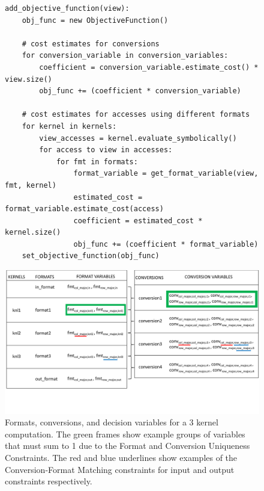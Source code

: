 \documentclass[sigconf,review=true]{acmart}
\begin{document}
\begin{figure}
\begin{lstlisting}[caption={Algorithm for constructing objective function.}, label={AlgObjFunc}]
add_objective_function(view):
	obj_func = new ObjectiveFunction()
	
	# cost estimates for conversions
	for conversion_variable in conversion_variables:
		coefficient = conversion_variable.estimate_cost() * view.size()
		obj_func += (coefficient * conversion_variable)
	
	# cost estimates for accesses using different formats
	for kernel in kernels:
		view_accesses = kernel.evaluate_symbolically()
		for access to view in accesses:
			for fmt in formats:
				format_variable = get_format_variable(view, fmt, kernel)
				estimated_cost = format_variable.estimate_cost(access)
				coefficient = estimated_cost * kernel.size()
				obj_func += (coefficient * format_variable)
	set_objective_function(obj_func)
\end{lstlisting}
\end{figure}

\begin{figure}
	\includegraphics[width=2\columnwidth]{FormatConversionFigure.pdf}
	\caption{Formats, conversions, and decision variables for a 3 kernel computation. The green frames show example groups of variables that must sum to 1 due to the Format and Conversion Uniqueness Constraints. The red and blue underlines show examples of the Conversion-Format Matching constraints for input and output constraints respectively. }
	\label{ConstraintExample}
\end{figure}
\end{document}
